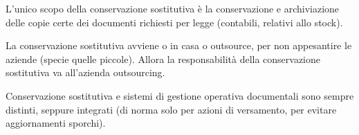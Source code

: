 L'unico scopo della conservazione sostitutiva \`e la conservazione e
archiviazione delle copie certe dei documenti richiesti per legge
(contabili, relativi allo stock).

La conservazione sostitutiva avviene o in casa o outsource, per non
appesantire le aziende (specie quelle piccole). Allora la responsabilit\`a
della conservazione sostitutiva va all'azienda outsourcing.

Conservazione sostitutiva e sistemi di gestione operativa documentali
sono sempre distinti, seppure integrati (di norma solo per azioni di
versamento, per evitare aggiornamenti sporchi).